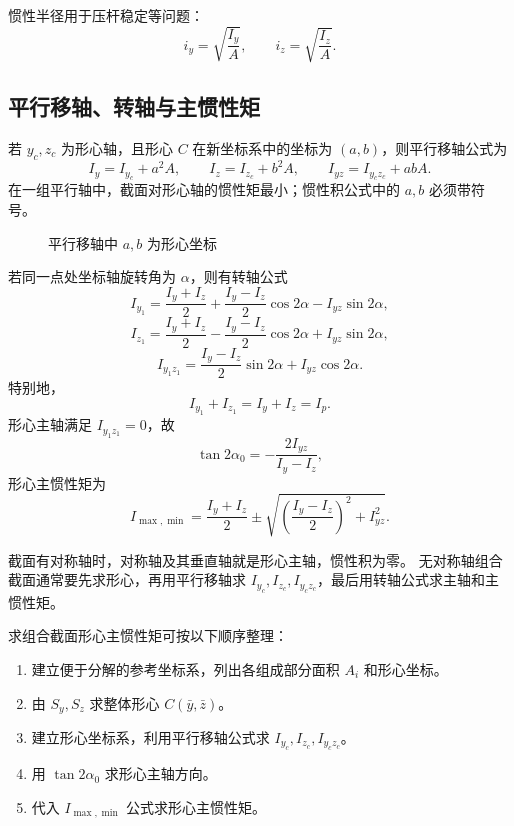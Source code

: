 \documentclass[a4,10pt,comentarios]{aleph-notas}
\begin{document}
惯性半径用于压杆稳定等问题：
\[
    i_y=\sqrt{\frac{I_y}{A}},\qquad
    i_z=\sqrt{\frac{I_z}{A}}.
\]

\subsection{平行移轴、转轴与主惯性矩}

若 $y_c,z_c$ 为形心轴，且形心 $C$ 在新坐标系中的坐标为 $(a,b)$，则平行移轴公式为
\[
    I_y=I_{y_c}+a^2A,\qquad
    I_z=I_{z_c}+b^2A,\qquad
    I_{yz}=I_{y_cz_c}+abA.
\]
在一组平行轴中，截面对形心轴的惯性矩最小；惯性积公式中的 $a,b$ 必须带符号。

\begin{figure}[H]
    \centering
    \caption{平行移轴中 $a,b$ 为形心坐标}
\end{figure}

若同一点处坐标轴旋转角为 $\alpha$，则有转轴公式
\[
    I_{y_1}
    =\frac{I_y+I_z}{2}
    +\frac{I_y-I_z}{2}\cos2\alpha
    -I_{yz}\sin2\alpha,
\]
\[
    I_{z_1}
    =\frac{I_y+I_z}{2}
    -\frac{I_y-I_z}{2}\cos2\alpha
    +I_{yz}\sin2\alpha,
\]
\[
    I_{y_1z_1}
    =\frac{I_y-I_z}{2}\sin2\alpha
    +I_{yz}\cos2\alpha.
\]
特别地，
\[
    I_{y_1}+I_{z_1}=I_y+I_z=I_p.
\]
形心主轴满足 $I_{y_1z_1}=0$，故
\[
    \tan2\alpha_0=-\frac{2I_{yz}}{I_y-I_z},
\]
形心主惯性矩为
\[
    I_{\max,\min}
    =\frac{I_y+I_z}{2}
    \pm
    \sqrt{\left(\frac{I_y-I_z}{2}\right)^2+I_{yz}^2}.
\]

\begin{advertencia}
    截面有对称轴时，对称轴及其垂直轴就是形心主轴，惯性积为零。
    无对称轴组合截面通常要先求形心，再用平行移轴求 $I_{y_c},I_{z_c},I_{y_cz_c}$，最后用转轴公式求主轴和主惯性矩。
\end{advertencia}

求组合截面形心主惯性矩可按以下顺序整理：
\begin{enumerate}[label=\arabic*.]
    \item 建立便于分解的参考坐标系，列出各组成部分面积 $A_i$ 和形心坐标。
    \item 由 $S_y,S_z$ 求整体形心 $C(\bar y,\bar z)$。
    \item 建立形心坐标系，利用平行移轴公式求 $I_{y_c},I_{z_c},I_{y_cz_c}$。
    \item 用 $\tan2\alpha_0$ 求形心主轴方向。
    \item 代入 $I_{\max,\min}$ 公式求形心主惯性矩。
\end{enumerate}
\end{document}
